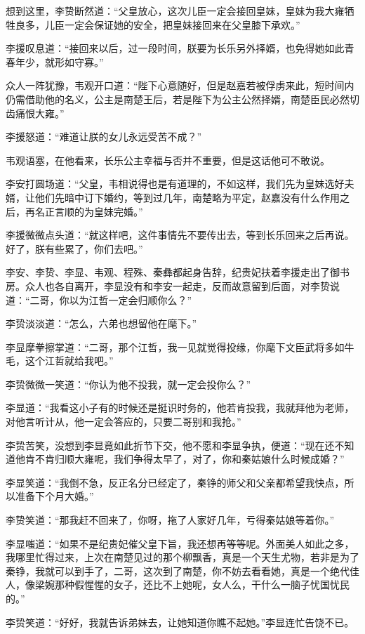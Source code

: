 想到这里，李贽断然道：“父皇放心，这次儿臣一定会接回皇妹，皇妹为我大雍牺牲良多，儿臣一定会保证她的安全，把皇妹接回来在父皇膝下承欢。”

李援叹息道：“接回来以后，过一段时间，朕要为长乐另外择婿，也免得她如此青春年少，就形如守寡。”

众人一阵犹豫，韦观开口道：“陛下心意随好，但是赵嘉若被俘虏来此，短时间内仍需借助他的名义，公主是南楚王后，若是陛下为公主公然择婿，南楚臣民必然切齿痛恨大雍。”

李援怒道：“难道让朕的女儿永远受苦不成？”

韦观语塞，在他看来，长乐公主幸福与否并不重要，但是这话他可不敢说。

李安打圆场道：“父皇，韦相说得也是有道理的，不如这样，我们先为皇妹选好夫婿，让他们先暗中订下婚约，等到过几年，南楚略为平定，赵嘉没有什么作用之后，再名正言顺的为皇妹完婚。”

李援微微点头道：“就这样吧，这件事情先不要传出去，等到长乐回来之后再说。好了，朕有些累了，你们去吧。”

李安、李贽、李显、韦观、程殊、秦彝都起身告辞，纪贵妃扶着李援走出了御书房。众人也各自离开，李显没有和李安一起走，反而故意留到后面，对李贽说道：“二哥，你以为江哲一定会归顺你么？”

李贽淡淡道：“怎么，六弟也想留他在麾下。”

李显摩拳擦掌道：“二哥，那个江哲，我一见就觉得投缘，你麾下文臣武将多如牛毛，这个江哲就给我吧。”

李贽微微一笑道：“你认为他不投我，就一定会投你么？”

李显道：“我看这小子有的时候还是挺识时务的，他若肯投我，我就拜他为老师，对他言听计从，他一定会答应的，只要二哥别和我抢。”

李贽苦笑，没想到李显竟如此折节下交，他不愿和李显争执，便道：“现在还不知道他肯不肯归顺大雍呢，我们争得太早了，对了，你和秦姑娘什么时候成婚？”

李显笑道：“我倒不急，反正名分已经定了，秦铮的师父和父亲都希望我快点，所以准备下个月大婚。”

李贽笑道：“那我赶不回来了，你呀，拖了人家好几年，亏得秦姑娘等着你。”

李显嗤道：“如果不是纪贵妃催父皇下旨，我还想再等等呢。外面美人如此之多，我哪里忙得过来，上次在南楚见过的那个柳飘香，真是一个天生尤物，若非是为了秦铮，我就可以到手了，二哥，这次到了南楚，你不妨去看看她，真是一个绝代佳人，像梁婉那种假惺惺的女子，还比不上她呢，女人么，干什么一脑子忧国忧民的。”

李贽笑道：“好好，我就告诉弟妹去，让她知道你瞧不起她。”李显连忙告饶不已。

